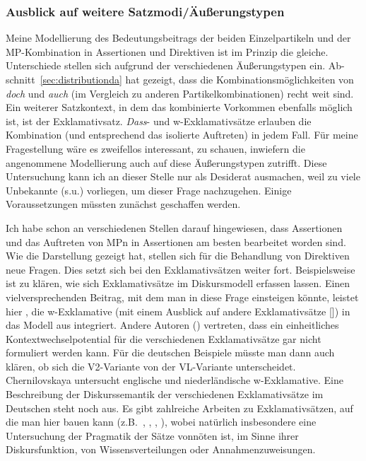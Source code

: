 \subsubsection{Ausblick auf weitere Satzmodi/Äußerungstypen}
Meine Modellierung des Bedeutungsbeitrags der beiden Einzelpartikeln und der MP-Kombination in Assertionen  und Direktiven  ist im Prinzip die gleiche. Unterschiede stellen sich aufgrund der verschiedenen Äußerungstypen ein. Ab-\linebreak schnitt~\ref{sec:distributionda} hat gezeigt, dass die Kombinationsmöglichkeiten von \textit{doch} und \textit{auch} (im Vergleich zu anderen Partikelkombinationen) recht weit sind. Ein weiterer Satzkontext, in dem das kombinierte Vorkommen ebenfalls möglich ist, ist der  Exklamativsatz. \textit{Dass}- und w-Exklamativsätze  erlauben die  Kombination (und entsprechend das isolierte Auftreten) in jedem Fall. Für meine Fragestellung wäre es zweifellos interessant, zu schauen, inwiefern die angenommene Modellierung auch auf diese Äußerungstypen zutrifft. Diese Untersuchung kann ich an dieser Stelle nur als Desiderat ausmachen, weil zu viele Unbekannte (s.u.) vorliegen, um dieser Frage nachzugehen. Einige Voraussetzungen müssten zunächst geschaffen werden. 

Ich habe schon an verschiedenen Stellen darauf hingewiesen, dass Assertionen und das Auftreten von MPn in Assertionen am besten bearbeitet worden sind. Wie die Darstellung gezeigt hat, stellen sich für die Behandlung von Direktiven neue Fragen. Dies setzt sich bei den Exklamativsätzen weiter fort. Beispiels\-weise ist zu klären, wie sich Exklamativsätze im Diskursmodell erfassen lassen. Einen vielversprechenden Beitrag, mit dem man in diese Frage einsteigen könn\-te, leistet hier \citet{Chernilovskaya2014}, die w-Exklamative (mit einem Ausblick auf andere Exklamativsätze [\citeyear[131]{Chernilovskaya2014}]) in das Modell aus \citet{Farkas2010} integriert. Andere Autoren (\citealt{CastroviejoMiro2008}) vertreten, dass ein einheitliches Kontextwechselpotential für die verschiedenen Exklamativsätze gar nicht formuliert werden kann. Für die deutschen Beispiele müsste man dann auch klären, ob sich die V2-Variante von der VL-Variante unterscheidet. Chernilovskaya untersucht englische und niederländische w-Exklamative. Eine Beschreibung der Diskurssemantik der verschiedenen Exklamativsätze im Deutschen steht noch aus. Es gibt zahlreiche Arbeiten zu Exklamativsätzen, auf die man hier bauen kann (z.B.\ \citealt{Roncador1977}, \citealt{Zaefferer1983}, \citealt{Rosengren1992}, \citealt{Avis2001}), wobei natürlich insbesondere eine Untersuchung der Pragmatik der Sätze vonnöten ist, im Sinne ihrer Diskursfunktion, von Wissensverteilungen oder Annahmenzuweisungen. 

